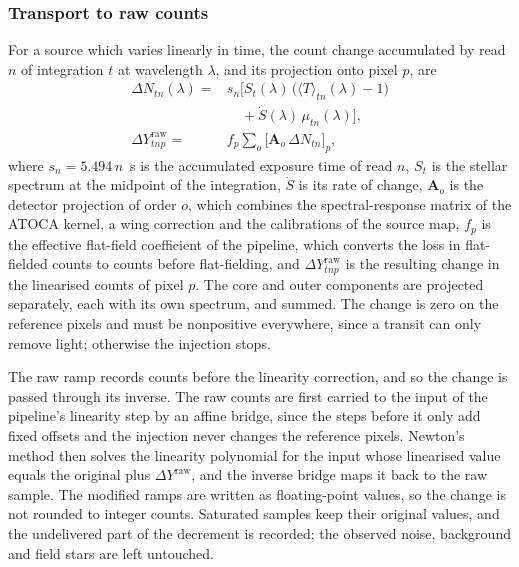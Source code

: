 \subsubsection{Transport to raw counts}
\label{sec:transport}

For a source which varies linearly in time, the count change accumulated by
read $n$ of integration $t$ at wavelength $\lambda$, and its projection onto
pixel $p$, are
\begin{equation}
\begin{split}
 \Delta N_{tn}(\lambda) = {}& s_n\big[S_t(\lambda)\,
 \big(\langle T\rangle_{tn}(\lambda)-1\big) \\
 &\quad +\dot S(\lambda)\,\mu_{tn}(\lambda)\big], \\
 \Delta Y^{\mathrm{raw}}_{tnp} = {}& f_p
 \sum_{o}\big[\bm{A}_o\,\Delta N_{tn}\big]_p ,
\end{split}
 \label{eq:v45-injector}
\end{equation}
where $s_n=5.494\,n$~s is the accumulated exposure time of read $n$, $S_t$ is
the stellar spectrum at the midpoint of the integration, $\dot S$ is its rate
of change, $\bm{A}_o$ is the detector projection of order $o$, which combines
the spectral-response matrix of the ATOCA kernel, a wing correction and the
calibrations of the source map, $f_p$ is the effective flat-field coefficient
of the pipeline, which converts the loss in flat-fielded counts to counts before
flat-fielding, and $\Delta Y^{\mathrm{raw}}_{tnp}$ is the resulting change in the
linearised counts of pixel $p$. The core and outer components are projected
separately, each with its own spectrum, and summed. The change is zero on the
reference pixels and must be nonpositive everywhere, since a transit can only
remove light; otherwise the injection stops.

The raw ramp records counts before the linearity correction, and so the
change is passed through its inverse. The raw counts are first carried to the
input of the pipeline's linearity step by an affine bridge, since the steps
before it only add fixed offsets and the injection never changes the
reference pixels. Newton's method
then solves the linearity polynomial for the input whose linearised value
equals the original plus $\Delta Y^{\mathrm{raw}}$, and the inverse bridge
maps it back to the raw sample. The modified ramps are written as
floating-point values, so the change is not rounded to integer counts.
Saturated samples keep their original values, and the undelivered part of
the decrement is recorded; the observed noise, background and field stars are
left untouched.


